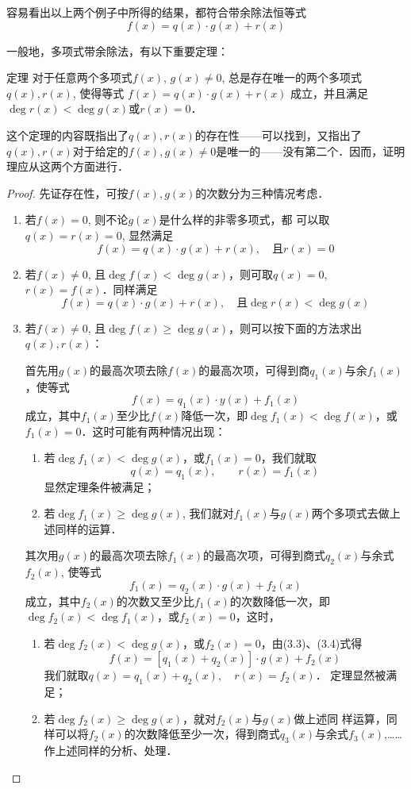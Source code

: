 容易看出以上两个例子中所得的结果，都符合带余除法恒等式
\[f (x) =q (x) \cdot g (x) +r (x) \]

一般地，多项式带余除法，有以下重要定理：

\begin{blk}{定理}
    对于任意两个多项式$f(x)$, $g(x)\ne 0$, 总是存在唯一的两个多项式$q(x),r(x)$, 使得等式
$f(x) =q(x)\cdot g (x) + r(x) $
成立，并且满足$\deg r(x)<\deg g(x)$或$r(x)=0$．
\end{blk}

\begin{analyze}
    这个定理的内容既指出了$q(x),r(x)$的存在性——可以找到，又指出了$q(x),r(x)$对于给定的$f(x),g(x)\ne 0$是唯一的——没有第二个．因而，证明理应从这两个方面进行．
\end{analyze}

\begin{proof}
    先证存在性，可按$f(x),g(x)$的次数分为三种情况考虑．
\begin{enumerate}
    \item 若$f(x)=0$, 则不论$g(x)$是什么样的非零多项式，都
可以取$q(x)=r(x)=0$, 显然满足
\[f(x)=q(x)\cdot g(x)+r(x),\quad \text{且}r(x)=0\]
\item 若$f(x)\ne 0$, 且$\deg f(x)<\deg g(x)$，则可取$q(x)=0$, $r(x)=f(x)$．同样满足
\[f(x)=q(x)\cdot g(x)+r(x),\quad \text{且}\deg r(x)<\deg g(x)\]
\item 若$f(x)\ne 0$, 且$\deg f(x)\ge \deg g(x)$，则可以按下面的方法求出$q(x), r(x)$：

首先用$g(x)$的最高次项去除$f(x)$的最高次项，可得到商$q_1(x)$与余$f_1(x)$，使等式
\begin{equation}
    f (x) =q_1 (x)\cdot y(x)+f_1(x)
\end{equation}
成立，其中$f_1(x)$至少比$f(x)$降低一次，即$\deg f_1(x)<\deg f(x)$，或$f_1(x)=0$．这时可能有两种情况出现：
\begin{enumerate}
    \item 若$\deg f_1(x)<\deg g(x)$，或$f_1(x)=0$，我们就取
    \[q(x)=q_1(x),\qquad r(x)=f_1(x)\]
显然定理条件被满足；
\item 若$\deg f_1(x)\ge \deg g(x)$, 我们就对$f_1(x)$与$g(x)$两个多项式去做上述同样的运算．
\end{enumerate}

其次用$g(x)$的最高次项去除$f_1(x)$的最高次项，可得到商式$q_2(x)$与余式$f_2(x)$, 使等式
\begin{equation}
    f_1(x)=q_2(x)\cdot g(x)+f_2(x)
\end{equation}
成立，其中$f_2(x)$的次数又至少比$f_1(x)$的次数降低一次，即$\deg f_2(x)<\deg f_1(x)$，或$f_2(x)=0$，这时，
\begin{enumerate}
    \item 若$\deg f_2(x)<\deg g(x)$，或$f_2(x)=0$，由(3.3)、(3.4)式得
    \[f(x)=[q_1(x)+q_2(x)]\cdot g(x)+f_2(x)\]
    我们就取$q(x)=q_1(x)+q_2(x),\quad r(x)=f_2(x)$．
    定理显然被满足；
    \item 若$\deg f_2(x)\ge \deg g(x)$，就对$f_2(x)$与$g(x)$做上述同
样运算，同样可以将$f_2(x)$的次数降低至少一次，得到商式$q_3(x)$与余式$f_3(x)$,……作上述同样的分析、处理．
\end{enumerate}


\end{enumerate}
\end{proof}
